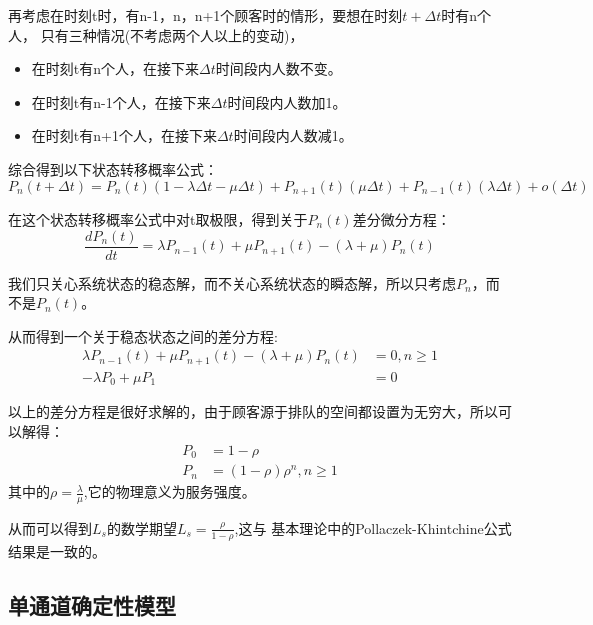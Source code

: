     
    再考虑在时刻t时，有n-1，n，n+1个顾客时的情形，要想在时刻$t+\Delta t$时有n个人，
    只有三种情况(不考虑两个人以上的变动)，
    \begin{itemize}
    \item 在时刻t有n个人，在接下来$\Delta t$时间段内人数不变。
    \item 在时刻t有n-1个人，在接下来$\Delta t$时间段内人数加1。
    \item 在时刻t有n+1个人，在接下来$\Delta t$时间段内人数减1。 
    \end{itemize}
    
    
    综合得到以下状态转移概率公式：
    \begin{equation}
        P_n(t+\Delta t)=P_n(t)(1-\lambda \Delta t-\mu \Delta t)+P_{n+1}(t)(\mu \Delta t) +P_{n-1}(t)(\lambda \Delta t)+o(\Delta t)
    \end{equation}
    
    在这个状态转移概率公式中对t取极限，得到关于$P_n(t)$差分微分方程：
    \begin{equation}
        \frac{d P_n(t)}{dt}=\lambda P_{n-1}(t)+\mu P_{n+1}(t)-(\lambda+\mu )P_n(t)
    \end{equation}
    
    我们只关心系统状态的稳态解，而不关心系统状态的瞬态解，所以只考虑$P_n$，而不是$P_n(t)$。
    
    从而得到一个关于稳态状态之间的差分方程:
    \begin{equation}
        \begin{aligned}
            \lambda P_{n-1}(t)+\mu P_{n+1}(t)-(\lambda+\mu )P_n(t)&=0,n\geq 1 \\
            -\lambda P_{0}+\mu P_{1}&=0
        \end{aligned}
    \end{equation}
    
    以上的差分方程是很好求解的，由于顾客源于排队的空间都设置为无穷大，所以可以解得：
    \begin{equation}
        \begin{aligned}
            P_0 &=1-\rho \\
            P_n &=(1-\rho)\rho^n,n\geq1
        \end{aligned}
    \end{equation}
    其中的$\rho=\frac{\lambda}{\mu}$,它的物理意义为服务强度。
    
    从而可以得到$L_s$的数学期望$L_s=\frac{\rho}{1-\rho}$,这与
    基本理论中的Pollaczek-Khintchine公式结果是一致的。
\subsection{单通道确定性模型}

